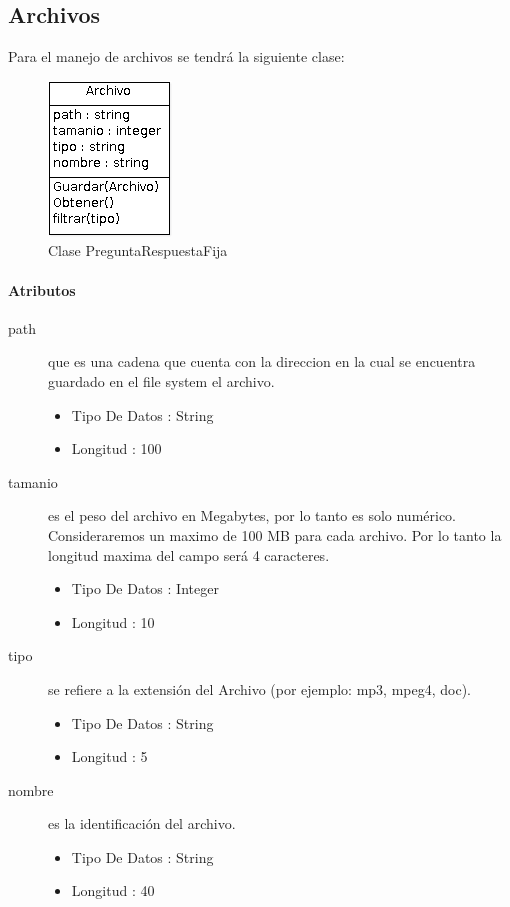 \documentclass{article}
\begin{document}
\subsection{Archivos}
	Para el manejo de archivos se tendr\'a la siguiente clase:
	
\begin{figure}[h]
\centering
\includegraphics[scale=0.8]{Archivo}

\caption{Clase PreguntaRespuestaFija}
\end{figure}
	
\paragraph{\large{Atributos}}
\begin{description}
		\item[path] que es una cadena que cuenta con la direccion en la cual se encuentra guardado en el file system el archivo.
		\begin{itemize}
			\item Tipo De Datos : String
			\item Longitud : 100
		\end{itemize}
		\item[tamanio] es el peso del archivo en Megabytes, por lo tanto es solo num\'erico. Consideraremos un maximo de 100 MB para cada archivo. Por lo tanto la longitud maxima del campo ser\'a 4 caracteres.
		\begin{itemize}
			\item Tipo De Datos : Integer
			\item Longitud : 10
		\end{itemize}
		\item[tipo] se refiere a la extensi\'on del Archivo (por ejemplo: mp3, mpeg4, doc).
		\begin{itemize}
			\item Tipo De Datos : String
			\item Longitud : 5
		\end{itemize}
		\item[nombre] es la identificaci\'on del archivo.
		\begin{itemize}
			\item Tipo De Datos : String
			\item Longitud : 40
		\end{itemize}
\end{description}
\end{document}
